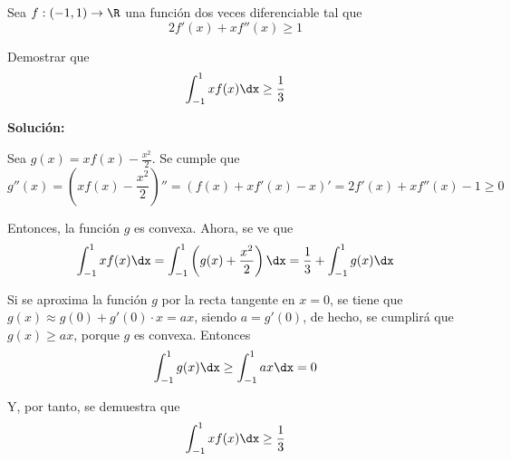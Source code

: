 \documentclass[../../main.tex]{subfiles}
\begin{document}
  \begin{shaded}
    Sea $f: (-1, 1) \to \R$ una función dos veces diferenciable tal que
    $$
    2 f'(x) + x f''(x) \geq 1
    $$

    Demostrar que
    $$
    \int_{-1}^1 x f(x) \dx \geq \frac{1}{3}
    $$
  \end{shaded}

  \textbf{Solución:}

  Sea $g(x) = x f(x) - \displaystyle\frac{x^2}{2}$. Se cumple que
  $$
  g''(x) = \left(x f(x) - \frac{x^2}{2}\right)'' = \left(f(x) + x f'(x) - x\right)' = 2 f'(x) + x f''(x) - 1 \geq 0
  $$

  Entonces, la función $g$ es convexa. Ahora, se ve que
  $$
  \int_{-1}^1 x f(x) \dx = \int_{-1}^1 \left(g(x) + \frac{x^2}{2}\right) \dx = \frac{1}{3} + \int_{-1}^1 g(x) \dx
  $$

  Si se aproxima la función $g$ por la recta tangente en $x = 0$, se tiene que $g(x) \approx g(0) + g'(0) \cdot x = a x$, siendo $a = g'(0)$, de hecho, se cumplirá que $g(x) \geq a x$, porque $g$ es convexa. Entonces
  $$
  \int_{-1}^1 g(x) \dx \geq \int_{-1}^1 a x \dx = 0
  $$

  Y, por tanto, se demuestra que
  $$
  \int_{-1}^1 x f(x) \dx \geq \frac{1}{3}
  $$
\end{document}
